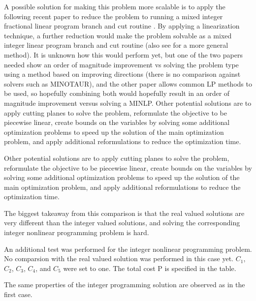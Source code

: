 A possible solution for making this problem more scalable is to apply the following recent paper to reduce the problem to running a mixed integer fractional linear program branch and cut routine \cite{ChYaMo:2024}. By applying a linearization technique, a further reduction would make the problem solvable as a mixed integer linear program branch and cut routine \cite{ChCo:1962} (also see \cite{YuFe:2014} for a more general method). It is unknown how this would perform yet, but one of the two papers needed show an order of magnitude improvement vs solving the problem type using a method based on improving directions (there is no comparison against solvers such as MINOTAUR), and the other paper allows common LP methods to be used, so hopefully combining both would hopefully result in an order of magnitude improvement versus solving a MINLP. Other potential solutions are to apply cutting planes to solve the problem, reformulate the objective to be piecewise linear, create bounds on the variables by solving some additional optimization problems to speed up the solution of the main optimization problem, and apply additional reformulations to reduce the optimization time.

Other potential solutions are to apply cutting planes to solve the problem, reformulate the objective to be piecewise linear, create bounds on the variables by solving some additional optimization problems to speed up the solution of the main optimization problem, and apply additional reformulations to reduce the optimization time.

The biggest takeaway from this comparison is that the real valued solutions are very different than the integer valued solutions, and solving the corresponding integer nonlinear programming problem is hard.

An additional test was performed for the integer nonlinear programming problem. No comparsion with the real valued solution was performed in this case yet. $C_1$, $C_2$, $C_3$, $C_4$, and $C_5$ were set to one. The total cost P is specified in the table.

\begin{table}[ht]
\centering
{}
\caption{Sample size for a second integer optimization problem.}
\label{Tab:Sample_Size2}
\end{table}
The same properties of the integer programming solution are observed as in the first case.


